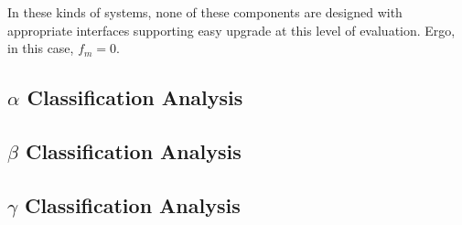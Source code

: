In these kinds of systems, none of these components are designed with appropriate interfaces supporting easy upgrade at this level of evaluation.  Ergo, in this case, $ f_{m} = 0 $.



\subsection{$\alpha$ Classification Analysis}

\subsection{$\beta$ Classification Analysis}

\subsection{$\gamma$ Classification Analysis}
